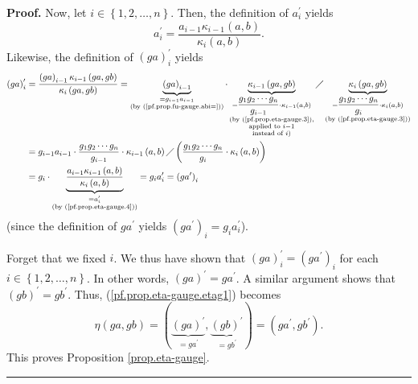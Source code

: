 \documentclass[numbers=enddot,12pt,final,onecolumn,notitlepage]{scrartcl}%
\theoremstyle{definition}
\newenvironment{proof}[1][Proof]{\noindent\textbf{#1.} }{\ \rule{0.5em}{0.5em}}
\newenvironment{verlong}{}{}
\begin{document}
\begin{verlong}
\begin{proof}
Now, let $i\in\left\{  1,2,\ldots,n\right\}  $. Then, the definition of
$a_{i}^{\prime}$ yields%
\begin{equation}
a_{i}^{\prime}=\dfrac{a_{i-1}\kappa_{i-1}\left(  a,b\right)  }{\kappa
_{i}\left(  a,b\right)  }.\label{pf.prop.eta-gauge.4}%
\end{equation}
Likewise, the definition of $\left(  ga\right)  _{i}^{\prime}$ yields%
\begin{align*}
\left(  ga\right)  _{i}^{\prime}  & =\dfrac{\left(  ga\right)  _{i-1}%
\kappa_{i-1}\left(  ga,gb\right)  }{\kappa_{i}\left(  ga,gb\right)
}=\underbrace{\left(  ga\right)  _{i-1}}_{\substack{=g_{i-1}a_{i-1}\\\text{(by
(\ref{pf.prop.fu-gauge.abi=}))}}}\cdot\underbrace{\kappa_{i-1}\left(
ga,gb\right)  }_{\substack{=\dfrac{g_{1}g_{2}\cdots g_{n}}{g_{i-1}}\cdot
\kappa_{i-1}\left(  a,b\right)  \\\text{(by (\ref{pf.prop.eta-gauge.3}%
),}\\\text{applied to }i-1\\\text{instead of }i\text{)}}}\diagup
\underbrace{\kappa_{i}\left(  ga,gb\right)  }_{\substack{=\dfrac{g_{1}%
g_{2}\cdots g_{n}}{g_{i}}\cdot\kappa_{i}\left(  a,b\right)  \\\text{(by
(\ref{pf.prop.eta-gauge.3}))}}}\\
& =g_{i-1}a_{i-1}\cdot\dfrac{g_{1}g_{2}\cdots g_{n}}{g_{i-1}}\cdot\kappa
_{i-1}\left(  a,b\right)  \diagup\left(  \dfrac{g_{1}g_{2}\cdots g_{n}}{g_{i}%
}\cdot\kappa_{i}\left(  a,b\right)  \right)  \\
& =g_{i}\cdot\underbrace{\dfrac{a_{i-1}\kappa_{i-1}\left(  a,b\right)
}{\kappa_{i}\left(  a,b\right)  }}_{\substack{=a_{i}^{\prime}\\\text{(by
(\ref{pf.prop.eta-gauge.4}))}}}=g_{i}a_{i}^{\prime}=\left(  ga^{\prime
}\right)  _{i}%
\end{align*}
(since the definition of $ga^{\prime}$ yields $\left(  ga^{\prime}\right)
_{i}=g_{i}a_{i}^{\prime}$).

Forget that we fixed $i$. We thus have shown that $\left(  ga\right)
_{i}^{\prime}=\left(  ga^{\prime}\right)  _{i}$ for each $i\in\left\{
1,2,\ldots,n\right\}  $. In other words, $\left(  ga\right)  ^{\prime
}=ga^{\prime}$. A similar argument shows that $\left(  gb\right)  ^{\prime
}=gb^{\prime}$. Thus, (\ref{pf.prop.eta-gauge.etag1}) becomes%
\[
\eta\left(  ga,gb\right)  =\left(  \underbrace{\left(  ga\right)  ^{\prime}%
}_{=ga^{\prime}},\underbrace{\left(  gb\right)  ^{\prime}}_{=gb^{\prime}%
}\right)  =\left(  ga^{\prime},gb^{\prime}\right)  .
\]
This proves Proposition \ref{prop.eta-gauge}.
\end{proof}
\end{verlong}
\end{document}
